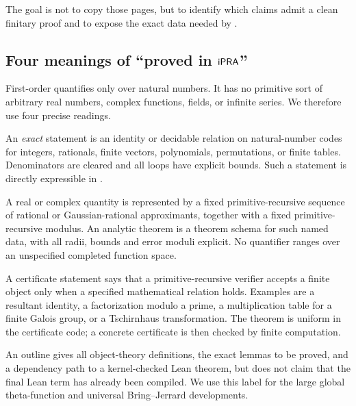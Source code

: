The goal is not to copy those pages, but to identify which claims admit a clean
finitary proof and to expose the exact data needed by \ipra.

\subsection{Four meanings of ``proved in \(\mathsf{iPRA}\)''}

First-order \ipra{} quantifies only over natural numbers.  It has no primitive
sort of arbitrary real numbers, complex functions, fields, or infinite
series.  We therefore use four precise readings.

\begin{definition}
An \emph{exact} statement is an identity or decidable relation on natural-number
codes for integers, rationals, finite vectors, polynomials, permutations, or
finite tables.  Denominators are cleared and all loops have explicit bounds.
Such a statement is directly expressible in \ipra.
\end{definition}

\begin{definition}
A real or complex quantity is represented by a fixed primitive-recursive
sequence of rational or Gaussian-rational approximants, together with a fixed
primitive-recursive modulus.  An analytic theorem is a theorem schema for such
named data, with all radii, bounds and error moduli explicit.  No quantifier
ranges over an unspecified completed function space.
\end{definition}

\begin{definition}
A certificate statement says that a primitive-recursive verifier accepts a
finite object only when a specified mathematical relation holds.  Examples are
a resultant identity, a factorization modulo a prime, a multiplication table
for a finite Galois group, or a Tschirnhaus transformation.  The theorem is
uniform in the certificate code; a concrete certificate is then checked by
finite computation.
\end{definition}

\begin{definition}
An outline gives all object-theory definitions, the exact lemmas to be proved,
and a dependency path to a kernel-checked Lean theorem, but does not claim that
the final Lean term has already been compiled.  We use this label for the
large global theta-function and universal Bring--Jerrard developments.
\end{definition}

